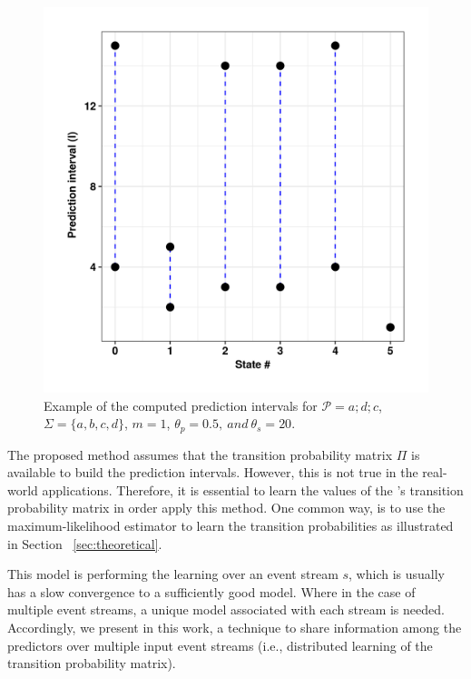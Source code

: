 \begin{figure}[H]
	\begin{centering}
		\center
			\includegraphics[width=\textwidth,keepaspectratio]{chapters/figures/new_prediction_intervals.png}
					
		\caption{Example of the computed prediction intervals for
			$\mathcal{P}=a ; d ; c$, $\Sigma=\{a,b,c,d\}$, $m=1$, $\theta_{p}=0.5,\ and\ \theta_{s}=20$.}
		\label{fig:predictionsIntervals}
	\end{centering}
\end{figure}

\par The proposed method assumes that the transition probability matrix $\Pi$ is available to build the prediction intervals. However, this is not true in the real-world applications.
Therefore, it is essential to learn the values of the \pmcmr's transition probability matrix in order apply this method. One common way, is to use the maximum-likelihood estimator to learn the transition probabilities as illustrated in Section ~\ref{sec:theoretical}. 

\par This model is performing the learning over an event stream $s$, which is usually has a slow convergence to a sufficiently good model. Where in the case of multiple event streams, a unique model associated with each stream is needed. Accordingly, we present in this work, a technique to share information among the \pmcmr predictors over multiple input event streams (i.e., distributed learning of the transition probability matrix).

